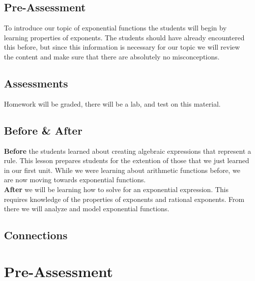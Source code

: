 \documentclass[12pt]{article}
\begin{document}
\subsection{Pre-Assessment} To introduce our topic of exponential functions the students will begin by learning properties of exponents. The students should have already encountered this before, but since this information is necessary for our topic we will review the content and make sure that there are absolutely no misconceptions.  
	


\subsection{Assessments} Homework will be graded, there will be a lab, and test on this material. 
	


\subsection{Before \& After}

	\textbf{Before} the students learned about creating algebraic expressions that represent a rule. This lesson prepares students for the extention of those that we just learned in our first unit. While we were learning about arithmetic functions before, we are now moving towards exponential functions.\\
	


	\textbf{After} we will be learning how to solve for an exponential expression. This requires knowledge of the properties of exponents and rational exponents. From there we will analyze and model exponential functions.
	

\subsection{Connections}



\let\stdsection\section
\renewcommand\section{\newpage\stdsection}

\section{Pre-Assessment}
\end{document}
